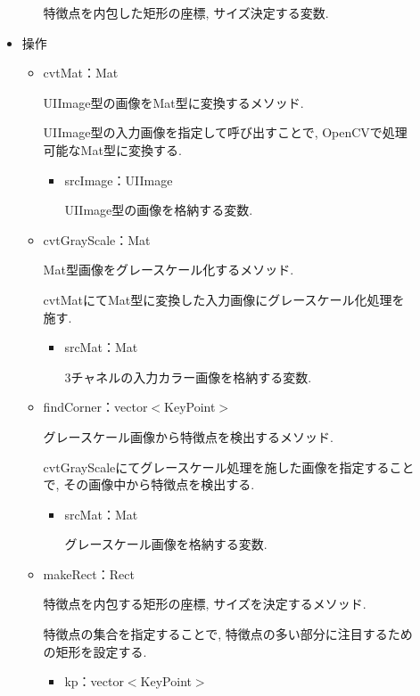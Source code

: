 \begin{description}
\begin{itemize}
\begin{itemize}
特徴点を内包した矩形の座標, サイズ決定する変数.

\end{itemize}

\item 操作

\begin{itemize}
\item cvtMat：Mat

UIImage型の画像をMat型に変換するメソッド.

UIImage型の入力画像を指定して呼び出すことで, OpenCVで処理可能なMat型に変換する.

\begin{itemize}
\item srcImage：UIImage

UIImage型の画像を格納する変数.
\end{itemize}

\item cvtGrayScale：Mat

Mat型画像をグレースケール化するメソッド.

cvtMatにてMat型に変換した入力画像にグレースケール化処理を施す.

\begin{itemize}
\item srcMat：Mat

3チャネルの入力カラー画像を格納する変数.
\end{itemize}

\item findCorner：vector$<$KeyPoint$>$

グレースケール画像から特徴点を検出するメソッド.

cvtGrayScaleにてグレースケール処理を施した画像を指定することで, その画像中から特徴点を検出する.

\begin{itemize}
\item srcMat：Mat

グレースケール画像を格納する変数.
\end{itemize}

\item makeRect：Rect

特徴点を内包する矩形の座標, サイズを決定するメソッド.

特徴点の集合を指定することで, 特徴点の多い部分に注目するための矩形を設定する.

\begin{itemize}
\item kp：vector$<$KeyPoint$>$


\end{itemize}
\end{itemize}
\end{itemize}
\end{description}
